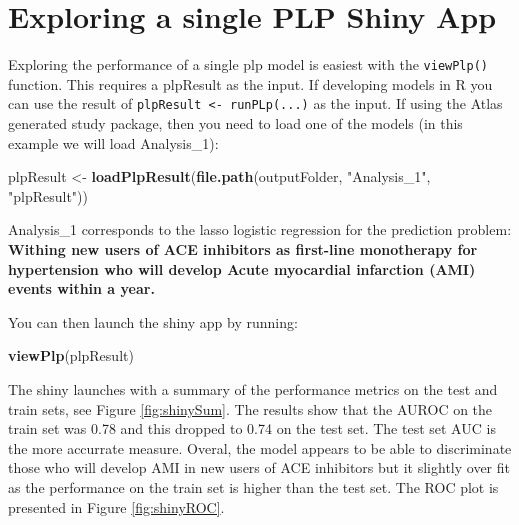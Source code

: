 \documentclass[11pt]{book}
\newenvironment{Shaded}{\begin{snugshade}}{\end{snugshade}}
\newcommand{\KeywordTok}[1]{\textcolor[rgb]{0.13,0.29,0.53}{\textbf{#1}}}
\newcommand{\NormalTok}[1]{#1}
\newcommand{\StringTok}[1]{\textcolor[rgb]{0.31,0.60,0.02}{#1}}
\theoremstyle{definition}
\theoremstyle{definition}
\theoremstyle{definition}
\theoremstyle{remark}
\begin{document}
\newpage

\hypertarget{exploring-a-single-plp-shiny-app}{%
\section{Exploring a single PLP Shiny App}\label{exploring-a-single-plp-shiny-app}}

Exploring the performance of a single plp model is easiest with the \texttt{viewPlp()} function. This requires a plpResult as the input. If developing models in R you can use the result of \texttt{plpResult\ \textless{}-\ runPLp(...)} as the input. If using the Atlas generated study package, then you need to load one of the models (in this example we will load Analysis\_1):

\begin{Shaded}
\begin{Highlighting}[]
\NormalTok{plpResult <-}\StringTok{ }\KeywordTok{loadPlpResult}\NormalTok{(}\KeywordTok{file.path}\NormalTok{(outputFolder, }\StringTok{"Analysis_1"}\NormalTok{, }\StringTok{"plpResult"}\NormalTok{))}
\end{Highlighting}
\end{Shaded}

Analysis\_1 corresponds to the lasso logistic regression for the prediction problem: \textbf{Withing new users of ACE inhibitors as first-line monotherapy for hypertension who will develop Acute myocardial infarction (AMI) events within a year.}

You can then launch the shiny app by running:

\begin{Shaded}
\begin{Highlighting}[]
\KeywordTok{viewPlp}\NormalTok{(plpResult)}
\end{Highlighting}
\end{Shaded}

The shiny launches with a summary of the performance metrics on the test and train sets, see Figure \ref{fig:shinySum}. The results show that the AUROC on the train set was 0.78 and this dropped to 0.74 on the test set. The test set AUC is the more accurrate measure. Overal, the model appears to be able to discriminate those who will develop AMI in new users of ACE inhibitors but it slightly over fit as the performance on the train set is higher than the test set. The ROC plot is presented in Figure \ref{fig:shinyROC}.
\end{document}
